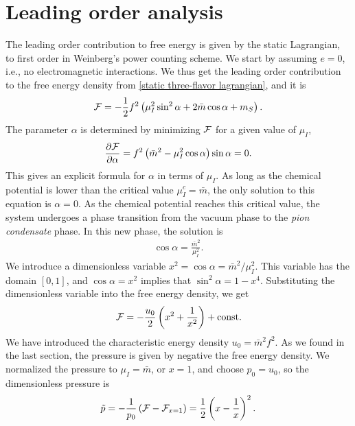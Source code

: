 
\section{Leading order analysis}

The leading order contribution to free energy is given by the static Lagrangian, to first order in Weinberg's power counting scheme.
We start by assuming $e = 0$, i.e., no electromagnetic interactions.
We thus get the leading order contribution to the free energy density from \autoref{static three-flavor lagrangian}, and it is
%
\begin{equation}
    \mathcal{F} 
    = 
    - \frac{1}{2} f^2
    \left(
        \mu_I^2 \sin^2\alpha
        + 2\bar m \cos\alpha
        + m_S
    \right).
\end{equation}
%
The parameter $\alpha$ is determined by minimizing $\mathcal{F}$ for a given value of $\mu_I$,
%
\begin{equation}
    \pdv{\mathcal{F}}{\alpha} = f^2 \left(\bar m^2 - \mu_I^2 \cos \alpha\right) \sin\alpha = 0.
\end{equation}
%
This gives an explicit formula for $\alpha$ in terms of $\mu_I$.
As long as the chemical potential is lower than the critical value $\mu_I^c = \bar m$, the only solution to this equation is $\alpha = 0$.
As the chemical potential reaches this critical value, the system undergoes a phase transition from the vacuum phase to the \emph{pion condensate} phase.
In this new phase, the solution is
%
\begin{align}
    \label{alpha as function of mu lowest order}
    \cos \alpha = \frac{\bar m^2}{\mu_I^2}.
\end{align}
%
We introduce a dimensionless variable $x^2 = \cos\alpha = \bar m^2 / \mu_I^2$.
This variable has the domain $[0, 1]$, and $\cos \alpha = x^2$ implies that $\sin^2 \alpha = 1 - x^4$.
Substituting the dimensionless variable into the free energy density, we get 
%
\begin{equation}
    \mathcal{F} = - \frac{u_0}{2} \left( x^2 + \frac{1}{x^2} \right) +\mathrm{const.}
\end{equation}
%
We have introduced the characteristic energy density $u_0 = \bar m^2 f^2$.
As we found in the last section, the pressure is given by negative the free energy density. 
We normalized the pressure to $\mu_I = \bar m$, or $x = 1$, and choose $p_0 = u_0$, so the dimensionless pressure is
%
\begin{equation}
    \label{pressure leading order chpt}
    \tilde p = -\frac{1}{p_0} \left(\mathcal{F} - \mathcal{F}_{x=1}\right) 
    = \frac{1}{2} \left(x - \frac{1}{x}\right)^2.
\end{equation}

